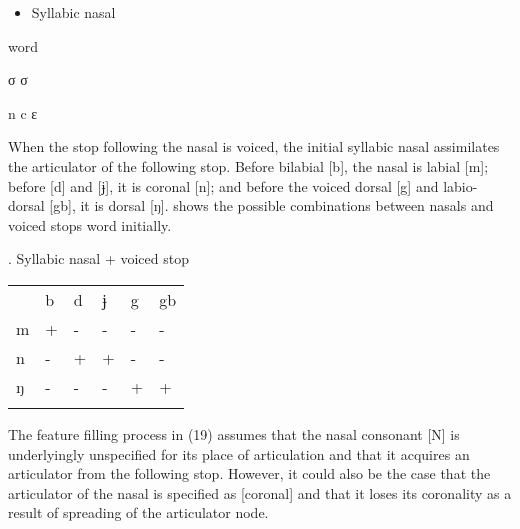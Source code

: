 \begin{itemize}
\item \begin{styleindexi}
   \label{bkm:Ref477000286}Syllabic nasal 
\end{styleindexi}\end{itemize}
\begin{styleindexi}
                      word  
\end{styleindexi}

\begin{styleindexi}
               σ                   σ           
\end{styleindexi}

\begin{styleindexi}
  
\end{styleindexi}

\begin{styleindexi}
               n            c             ɛ
\end{styleindexi}

When the stop following the nasal is voiced, the initial syllabic nasal assimilates the articulator of the following stop. Before bilabial [b], the nasal is labial [m]; before [d] and [ɉ], it is coronal [n]; and before the voiced dorsal [g] and labio-dorsal [gb], it is dorsal [ŋ].  shows the possible combinations between nasals and voiced stops word initially. 

\begin{styleindexi}
   \textbf{}. Syllabic nasal + voiced stop
\end{styleindexi}

\begin{tabularx}{\textwidth}{XXXXXX} & b & d & ɉ & g & gb\\
\lsptoprule
m & + & {}- & {}- & {}- & {}-\\
n & {}- & + & + & {}- & {}-\\
ŋ & {}- & {}- & {}- & + & +\\
\lspbottomrule
\end{tabularx}
The feature filling process in (19) assumes that the nasal consonant [N] is underlyingly unspecified for its place of articulation and that it acquires an articulator from the following stop. However, it could also be the case that the articulator of the nasal is specified as [coronal] and that it loses its coronality as a result of spreading of the articulator node.

